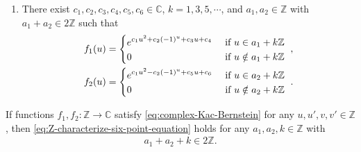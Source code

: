 \documentclass[10pt,a4paper]{amsart}
\begin{document}
\begin{theorem}
\begin{enumerate}
\item \label{item:Z-characterize-Gauss}

There exist $c_1 , c_2 , c_3 , c_4 , c_5 , c_6 \in \mathbb{ C } $, $ k = 1 , 3 , 5 , \cdots $, and $ a_1 , a_2 \in \mathbb{ Z } $ with $ a_1 + a_2 \in 2 \mathbb{ Z } $ such that
\begin{align}
  f_1 ( u )
  & =
  \left\{
  \begin{aligned}
    & e^{ c_1 u^2 + c_2 ( - 1 )^u + c_3 u + c_4 } & & \text{ if $ u \in a_1 + k \mathbb{ Z } $} \\
    & 0 & & \text{ if $ u \notin a_1 + k \mathbb{ Z } $ }
  \end{aligned}
  \right. , \\
  f_2 ( u )
  & =
  \left\{
  \begin{aligned}
    & e^{ c_1 u^2 - c_2 ( - 1 )^u + c_5 u + c_6 } & & \text{ if $ u \in a_2 + k \mathbb{ Z } $} \\
    & 0 & & \text{ if $ u \notin a_2 + k \mathbb{ Z } $ }
  \end{aligned}
  \right. .
\end{align}

\end{enumerate}

\end{theorem}

\begin{lemma}
    \label{lem:six-point-equation}

If functions $ f_1 , f_2 \colon \mathbb{ Z } \to \mathbb{ C } $ satisfy \eqref{eq:complex-Kac-Bernstein} for any $ u , u' , v , v' \in \mathbb{ Z } $, then \eqref{eq:Z-characterize-six-point-equation} holds for any $ a_1 , a_2 , k \in \mathbb{ Z } $ with
\begin{align}
   a_1 + a_2 + k \in 2 \mathbb{ Z }. \label{eq:six-point-equation-assume}
\end{align}

\end{lemma}
\end{document}
